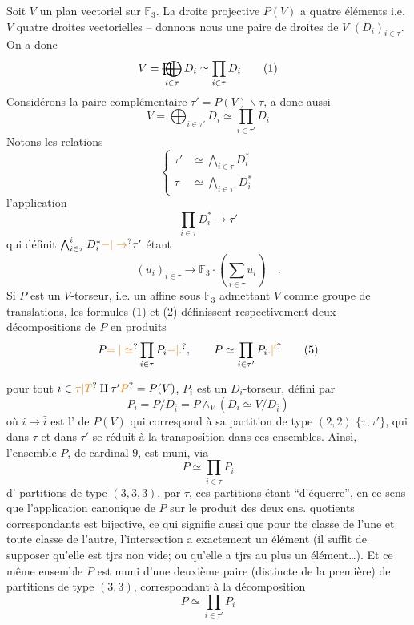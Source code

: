 Soit $V$ un plan vectoriel sur $\mathbb F_3$. La droite projective $P(V)$ a quatre éléments i.e. $V$  quatre droites vectorielles -- donnons nous une paire  de droites de $V$ $(D_i)_{i\in\tau}$. On a donc
\[
V=\mathop{\deleted{\prod}\mkern-15mu\bigoplus}_{i\in\tau}D_i\simeq\prod_{i\in\tau}D_i
\tag*{(1)}
\]
Considérons la paire complémentaire $\tau'=P(V)\smallsetminus\tau$,  a donc aussi
\[
V=\bigoplus_{i\in\tau'}D_i\simeq\prod_{i\in\tau'}D_i
\tag*{(2)}
\]
Notons les relations
\[
\left\{\begin{aligned}
\tau'&\simeq\bigwedge_{i\in\tau}D_i^*\\
\tau&\simeq\bigwedge_{i\in\tau'}D_i^*
\end{aligned}\right.
\tag*{(3)}
\]
l'application
\[
\prod_{i\in\tau}D_i^*\longrightarrow\tau'
\]
qui définit $\bigwedge_{i\in\tau}^{i}D_i^*\unsure{\mathord{-}|\to}\tau'$ étant
\[
(u_i)_{i\in\tau}\longrightarrow\mathbb F_3\mathbin{\cdot}
\left(\sum_{i\in\tau}u_i\right)\quad.
\tag*{(4)}
\]
Si $P$ est un $V$-torseur, i.e. un  affine sous $\mathbb F_3$ admettant $V$ comme groupe de translations,  les formules (1) et (2) définissent respectivement deux décompositions de $P$ en produits
\[
P\unsure{=|\simeq}\prod_{i\in\tau}P_i\unsure{\mathord{-}|\mathord{.}},\qquad
P\simeq\prod_{i\in\tau'}P_i\unsure{.|'}
\tag*{(5)}
\]

 pour tout $i\in\unsure{\tau|T}\amalg\tau'\deleted{\unsure{P}}=P(V)$, $P_i$ est un $D_i$-torseur, défini par
\[
P_i=P/D_{\bar i}=P\wedge_V(D_i\simeq V/D_{\bar i})
\tag*{(6)}
\]
où $i\mapsto\bar i$ est l' de $P(V)$ qui  correspond à sa partition de type $(2,2)$ $\{\tau,\tau'\}$, qui dans $\tau$ et dans $\tau'$ se réduit à la transposition dans ces ensembles. Ainsi, l'ensemble $P$, de cardinal $9$, est muni, via
\[
P\simeq\prod_{i\in\tau}P_i
\tag*{$(*)$}
\]
d' partitions de type $(3,3,3)$,  par $\tau$, ces partitions étant ``d'équerre'', en ce sens que l'application canonique  de $P$ sur le produit des deux ens. quotients correspondants est bijective, ce qui signifie aussi que pour tte classe de l'une et toute classe de l'autre, l'intersection a exactement un élément (il suffit de supposer qu'elle est tjrs non vide; ou qu'elle a tjrs au plus un élément\ldots). Et ce même ensemble $P$ est muni d'une deuxième paire (distincte de la première) de partitions de type $(3,3)$,  correspondant à la décomposition
\[
P\simeq\prod_{i\in\tau'}P_i
\tag*{$(*')$}
\]

